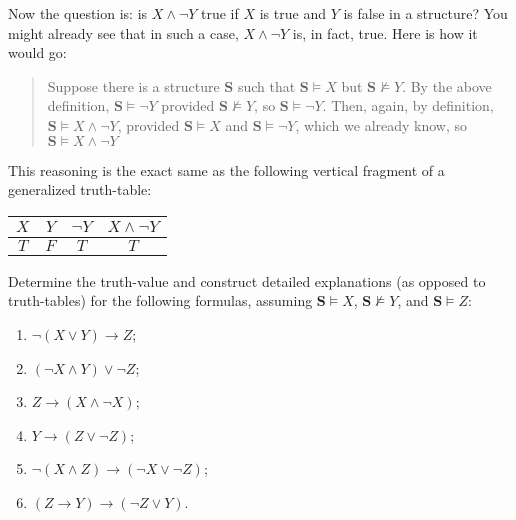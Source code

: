 
Now the question is: is $X \wedge \neg Y$ true if $X$ is true and $Y$ is false in a structure? You might already see that in such a case, $X \wedge \neg Y$ is, in fact, true. Here is how it would go:

\begin{quote}
Suppose there is a structure $\mathbf{S}$ such that $\mathbf{S} \models X$ but $\mathbf{S} \not\models Y$. By the above definition, $\mathbf{S} \models \neg Y$ provided $\mathbf{S} \not\models Y$, so $\mathbf{S} \models \neg Y$. Then, again, by definition, $\mathbf{S} \models X \wedge \neg Y$, provided $\mathbf{S} \models X$ and $\mathbf{S} \models \neg Y$, which we already know, so $\mathbf{S} \models X \wedge \neg Y$
\end{quote}

This reasoning is the exact same as the following vertical fragment of a generalized truth-table:

\begin{center}
\begin{tabular}{c|c|c|c}
$X$ & $Y$ & $\neg Y$ & $X \wedge \neg Y$ \\\hline
$T$ & $F$ & $T$ & $T$
\end{tabular}
\end{center}

\begin{exc}
Determine the truth-value and construct detailed explanations (as opposed to truth-tables) for the following formulas, assuming $\mathbf{S} \models X$, $\mathbf{S} \not\models Y$, and $\mathbf{S} \models Z$:

\begin{enumerate}
	\item $\neg (X \vee Y) \rightarrow Z$;
	\item $(\neg X \wedge Y) \vee \neg Z$;
	\item $Z \rightarrow (X \wedge \neg X)$;
	\item $Y \rightarrow (Z \vee \neg Z)$;
	\item $\neg (X \wedge Z) \rightarrow (\neg X \vee \neg Z)$;
	\item $(Z \rightarrow Y) \rightarrow (\neg Z \vee Y)$.
\end{enumerate}
\end{exc}


